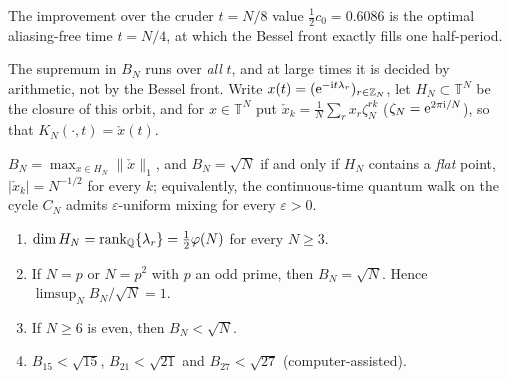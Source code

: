 \noindent The improvement over the cruder $t=N/8$ value $\tfrac12 c_0=0.6086$ is the optimal aliasing-free
time $t=N/4$, at which the Bessel front exactly fills one half-period.

The supremum in $B_N$ runs over \emph{all} $t$, and at large times it is decided by arithmetic, not by the
Bessel front. Write $x(t)=(\mathrm{e}^{-\mathrm it\lambda_r})_{r\in\mathbb{Z}_N}$, let $H_N\subset\mathbb T^N$ be the closure of
this orbit, and for $x\in\mathbb T^N$ put $\check x_k=\frac1N\sum_rx_r\zeta_N^{rk}$ ($\zeta_N=\mathrm{e}^{2\pi\mathrm i/N}$),
so that $K_N(\cdot,t)=\check x(t)$.

\begin{theorem}\label{thm:bn-saturation}
$B_N=\max_{x\in H_N}\|\check x\|_1$, and $B_N=\sqrt N$ if and only if $H_N$ contains a \emph{flat} point,
$|\check x_k|=N^{-1/2}$ for every $k$; equivalently, the continuous-time quantum walk on the cycle $C_N$
admits $\varepsilon$-uniform mixing for every $\varepsilon>0$.
\begin{enumerate}
\item $\dim H_N=\operatorname{rank}_{\mathbb{Q}}\{\lambda_r\}=\tfrac12\varphi(N)$ for every $N\ge3$.
\item If $N=p$ or $N=p^2$ with $p$ an odd prime, then $B_N=\sqrt N$. Hence $\limsup_NB_N/\sqrt N=1$.
\item If $N\ge6$ is even, then $B_N<\sqrt N$.
\item $B_{15}<\sqrt{15}$, $B_{21}<\sqrt{21}$ and $B_{27}<\sqrt{27}$ (computer-assisted).
\end{enumerate}
\end{theorem}

